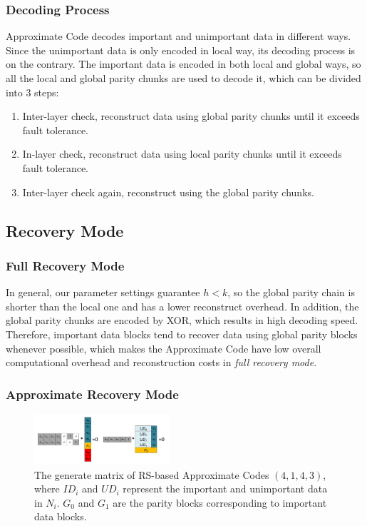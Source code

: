 \documentclass[sigconf]{acmart}
\begin{document}
\subsubsection{Decoding Process}
Approximate Code decodes important and unimportant data in different ways. Since the unimportant data is only encoded in local way, its decoding process is on the contrary.
The important data is encoded in both local and global ways, so all the local and global parity chunks are used to decode it, which can be divided into 3 steps:
\begin{enumerate}
\item Inter-layer check, reconstruct data using global parity chunks until it exceeds fault tolerance.
\item In-layer check, reconstruct data using local parity chunks until it exceeds fault tolerance.
\item Inter-layer check again, reconstruct using the global parity chunks.
\end{enumerate}
\subsection{Recovery Mode}
\subsubsection{Full Recovery Mode}
In general, our parameter settings guarantee $h<k$, so the global parity chain is shorter than the local one and has a lower reconstruct overhead.
In addition, the global parity chunks are encoded by XOR, which results in high decoding speed.
Therefore, important data blocks tend to recover data using global parity blocks whenever possible, which makes the Approximate Code have low overall computational overhead and reconstruction costs in \emph{full recovery mode}.
\subsubsection{Approximate Recovery Mode}
\fi

\begin{figure}[htb]
\centering
\includegraphics[width=0.45\textwidth]{photo/AP-RS-43.pdf}
\caption{The generate matrix of RS-based Approximate Codes $(4,1,4,3)$, where $ID_i$ and $UD_i$ represent the important and unimportant data in $N_i$. $G_0$ and $G_1$ are the parity blocks corresponding to important data blocks.}
\label{fig-ap-rs}
\end{figure}
\end{document}
